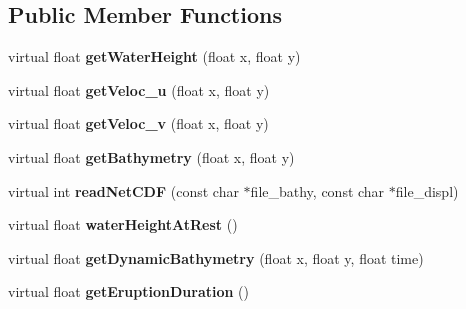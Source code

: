 \subsection*{Public Member Functions}
\begin{DoxyCompactItemize}
\item 
\hypertarget{classSWE__NetCDFScenario_a55280fc14463e71690873f216ac6a183}{virtual float {\bfseries get\-Water\-Height} (float x, float y)}\label{classSWE__NetCDFScenario_a55280fc14463e71690873f216ac6a183}

\item 
\hypertarget{classSWE__NetCDFScenario_a3baf29d2c3a42fda41f794154c2aa68e}{virtual float {\bfseries get\-Veloc\-\_\-u} (float x, float y)}\label{classSWE__NetCDFScenario_a3baf29d2c3a42fda41f794154c2aa68e}

\item 
\hypertarget{classSWE__NetCDFScenario_a145fe6e918b530a3330aec83a8e256cf}{virtual float {\bfseries get\-Veloc\-\_\-v} (float x, float y)}\label{classSWE__NetCDFScenario_a145fe6e918b530a3330aec83a8e256cf}

\item 
\hypertarget{classSWE__NetCDFScenario_ae2dbb9da3cca9052042edef4b1f98937}{virtual float {\bfseries get\-Bathymetry} (float x, float y)}\label{classSWE__NetCDFScenario_ae2dbb9da3cca9052042edef4b1f98937}

\item 
\hypertarget{classSWE__NetCDFScenario_acc616360a2cdb2e09c835b0a5c2c6586}{virtual int {\bfseries read\-Net\-C\-D\-F} (const char $\ast$file\-\_\-bathy, const char $\ast$file\-\_\-displ)}\label{classSWE__NetCDFScenario_acc616360a2cdb2e09c835b0a5c2c6586}

\item 
\hypertarget{classSWE__NetCDFScenario_ac17ba372d3943b05f3ed18912199b8b0}{virtual float {\bfseries water\-Height\-At\-Rest} ()}\label{classSWE__NetCDFScenario_ac17ba372d3943b05f3ed18912199b8b0}

\item 
\hypertarget{classSWE__NetCDFScenario_a0ffd2a0425ac20971cb15f08614e721b}{virtual float {\bfseries get\-Dynamic\-Bathymetry} (float x, float y, float time)}\label{classSWE__NetCDFScenario_a0ffd2a0425ac20971cb15f08614e721b}

\item 
\hypertarget{classSWE__NetCDFScenario_ae0de57b8e764a0ced60c1e350028894c}{virtual float {\bfseries get\-Eruption\-Duration} ()}\label{classSWE__NetCDFScenario_ae0de57b8e764a0ced60c1e350028894c}


\end{DoxyCompactItemize}
